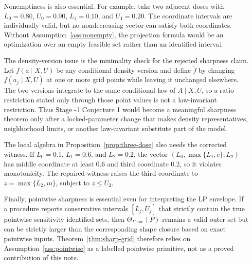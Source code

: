 \documentclass[11pt]{article}
\theoremstyle{definition}
\theoremstyle{plain}
\theoremstyle{remark}
\begin{document}
Nonemptiness is also essential.  For example, take two adjacent doses with \(L_0=0.80\), \(U_0=0.90\), \(L_1=0.10\), and \(U_1=0.20\).  The coordinate intervals are individually valid, but no nondecreasing vector can satisfy both coordinates.  Without Assumption~\ref{ass:nonempty}, the projection formula would be an optimization over an empty feasible set rather than an identified interval.

The density-version issue is the minimality check for the rejected sharpness claim.  Let \(f(a\mid X,U)\) be any conditional density version and define \(\tilde f\) by changing \(f(a_j\mid X,U)\) at one or more grid points while leaving it unchanged elsewhere.  The two versions integrate to the same conditional law of \(A\mid X,U\), so a ratio restriction stated only through those point values is not a law-invariant restriction.  Thus Stage -1 Conjecture 1 would become a meaningful sharpness theorem only after a locked-parameter change that makes density representatives, neighborhood limits, or another law-invariant substitute part of the model.

The local algebra in Proposition~\ref{prop:three-dose} also needs the corrected witness.  If \(L_0=0.1\), \(L_1=0.6\), and \(L_2=0.2\), the vector \((L_0,\max\{L_1,c\},L_2)\) has middle coordinate at least \(0.6\) and third coordinate \(0.2\), so it violates monotonicity.  The repaired witness raises the third coordinate to \(z=\max\{L_2,m\}\), subject to \(z\le U_2\).

Finally, pointwise sharpness is essential even for interpreting the LP envelope.  If a procedure reports conservative intervals \([L_j,U_j]\) that strictly contain the true pointwise sensitivity identified sets, then \(\Theta_{\Gamma,\mathrm{mc}}(P)\) remains a valid outer set but can be strictly larger than the corresponding shape closure based on exact pointwise inputs.  Theorem~\ref{thm:sharp-grid} therefore relies on Assumption~\ref{ass:pointwise} as a labelled pointwise primitive, not as a proved contribution of this note.
\end{document}
